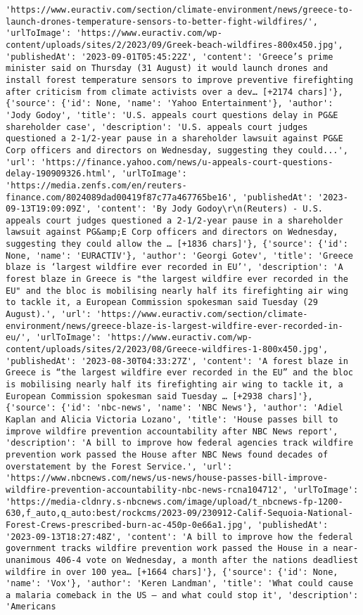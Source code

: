 \documentclass[
  letterpaper,
  DIV=11,
  numbers=noendperiod]{scrartcl}
\begin{document}
\begin{verbatim}
'https://www.euractiv.com/section/climate-environment/news/greece-to-launch-drones-temperature-sensors-to-better-fight-wildfires/', 'urlToImage': 'https://www.euractiv.com/wp-content/uploads/sites/2/2023/09/Greek-beach-wildfires-800x450.jpg', 'publishedAt': '2023-09-01T05:45:22Z', 'content': 'Greece’s prime minister said on Thursday (31 August) it would launch drones and install forest temperature sensors to improve preventive firefighting after criticism from climate activists over a dev… [+2174 chars]'}, {'source': {'id': None, 'name': 'Yahoo Entertainment'}, 'author': 'Jody Godoy', 'title': 'U.S. appeals court questions delay in PG&E shareholder case', 'description': 'U.S. appeals court judges questioned a 2-1/2-year pause in a shareholder lawsuit against PG&E Corp officers and directors on Wednesday, suggesting they could...', 'url': 'https://finance.yahoo.com/news/u-appeals-court-questions-delay-190909326.html', 'urlToImage': 'https://media.zenfs.com/en/reuters-finance.com/8024089dad00419f87c77a467765be16', 'publishedAt': '2023-09-13T19:09:09Z', 'content': 'By Jody Godoy\r\n(Reuters) - U.S. appeals court judges questioned a 2-1/2-year pause in a shareholder lawsuit against PG&amp;E Corp officers and directors on Wednesday, suggesting they could allow the … [+1836 chars]'}, {'source': {'id': None, 'name': 'EURACTIV'}, 'author': 'Georgi Gotev', 'title': 'Greece blaze is ‘largest wildfire ever recorded in EU’', 'description': 'A forest blaze in Greece is "the largest wildfire ever recorded in the EU" and the bloc is mobilising nearly half its firefighting air wing to tackle it, a European Commission spokesman said Tuesday (29 August).', 'url': 'https://www.euractiv.com/section/climate-environment/news/greece-blaze-is-largest-wildfire-ever-recorded-in-eu/', 'urlToImage': 'https://www.euractiv.com/wp-content/uploads/sites/2/2023/08/Greece-wildfires-1-800x450.jpg', 'publishedAt': '2023-08-30T04:33:27Z', 'content': 'A forest blaze in Greece is “the largest wildfire ever recorded in the EU” and the bloc is mobilising nearly half its firefighting air wing to tackle it, a European Commission spokesman said Tuesday … [+2938 chars]'}, {'source': {'id': 'nbc-news', 'name': 'NBC News'}, 'author': 'Adiel Kaplan and Alicia Victoria Lozano', 'title': 'House passes bill to improve wildfire prevention accountability after NBC News report', 'description': 'A bill to improve how federal agencies track wildfire prevention work passed the House after NBC News found decades of overstatement by the Forest Service.', 'url': 'https://www.nbcnews.com/news/us-news/house-passes-bill-improve-wildfire-prevention-accountability-nbc-news-rcna104712', 'urlToImage': 'https://media-cldnry.s-nbcnews.com/image/upload/t_nbcnews-fp-1200-630,f_auto,q_auto:best/rockcms/2023-09/230912-Calif-Sequoia-National-Forest-Crews-prescribed-burn-ac-450p-0e66a1.jpg', 'publishedAt': '2023-09-13T18:27:48Z', 'content': 'A bill to improve how the federal government tracks wildfire prevention work passed the House in a near-unanimous 406-4 vote on Wednesday, a month after the nations deadliest wildfire in over 100 yea… [+1664 chars]'}, {'source': {'id': None, 'name': 'Vox'}, 'author': 'Keren Landman', 'title': 'What could cause a malaria comeback in the US — and what could stop it', 'description': 'Americans 
\end{verbatim}
\end{document}
